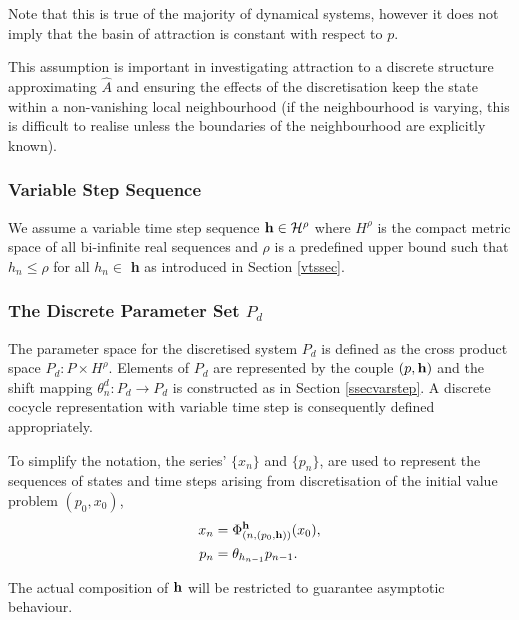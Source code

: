 Note that this is true of the majority of dynamical systems, however it does not
imply that the basin of attraction is constant with respect to $p$.

This assumption is important in investigating attraction to a
discrete structure approximating $\hat{A}$ and ensuring the effects of
the discretisation keep the state within a non-vanishing local
neighbourhood (if the neighbourhood is varying, this is difficult
to realise unless the boundaries of the neighbourhood are
explicitly known).


\subsubsection{Variable Step Sequence}

We assume a variable time step sequence ${\bf h} \in
\mathcal{H}^{\rho}$ where $H^{\rho}$ is the compact metric space
of all bi-infinite real sequences and $\rho$ is a predefined upper
bound such that $h_n \leq \rho$ for all $h_n \in$ \textbf{h} as
introduced in Section \ref{vtssec}.

\subsubsection{The Discrete Parameter Set $P_d$}

The parameter space for the discretised system $P_d$ is defined as the cross
product space $P_d: P \times H^{\rho}$. Elements of $P_d$
are represented by the couple $(p, {\bf h})$ and the shift mapping
$\theta^d_n : P_d \to P_d$ is constructed as in Section
\ref{ssecvarstep}. A discrete cocycle representation with variable
time step is consequently defined appropriately.

To simplify the notation, the series' $\{ x_n \}$ and $\{ p_n \}$, are
used to represent the sequences of states and time steps arising from
discretisation of the initial value problem $(p_0, x_0)$,
\begin{align*}
  x_n &= \Phi^{{\bf h}}_{(n,(p_0,{\bf h}))}(x_0), \\
  p_n &= \theta_{h_{n-1}}p_{n-1}. \\
\end{align*}

The actual composition of ${\bf h}$ will be restricted to
guarantee asymptotic behaviour.


